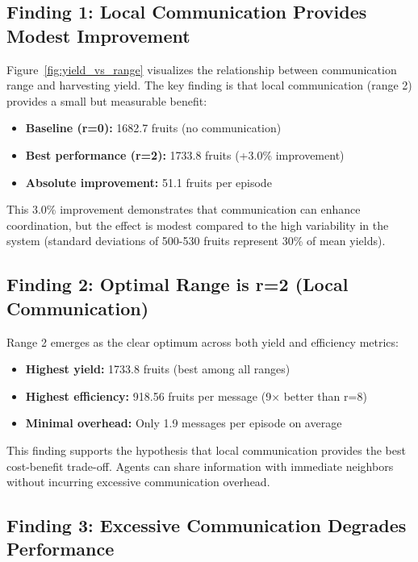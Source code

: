 \subsection{Finding 1: Local Communication Provides Modest Improvement}

Figure~\ref{fig:yield_vs_range} visualizes the relationship between communication range and harvesting yield. The key finding is that local communication (range 2) provides a small but measurable benefit:

\begin{itemize}
    \item \textbf{Baseline (r=0):} 1682.7 fruits (no communication)
    \item \textbf{Best performance (r=2):} 1733.8 fruits (+3.0\% improvement)
    \item \textbf{Absolute improvement:} 51.1 fruits per episode
\end{itemize}

This 3.0\% improvement demonstrates that communication can enhance coordination, but the effect is modest compared to the high variability in the system (standard deviations of 500-530 fruits represent 30\% of mean yields).

\subsection{Finding 2: Optimal Range is r=2 (Local Communication)}

Range 2 emerges as the clear optimum across both yield and efficiency metrics:

\begin{itemize}
    \item \textbf{Highest yield:} 1733.8 fruits (best among all ranges)
    \item \textbf{Highest efficiency:} 918.56 fruits per message (9× better than r=8)
    \item \textbf{Minimal overhead:} Only 1.9 messages per episode on average
\end{itemize}

This finding supports the hypothesis that local communication provides the best cost-benefit trade-off. Agents can share information with immediate neighbors without incurring excessive communication overhead.

\subsection{Finding 3: Excessive Communication Degrades Performance}

